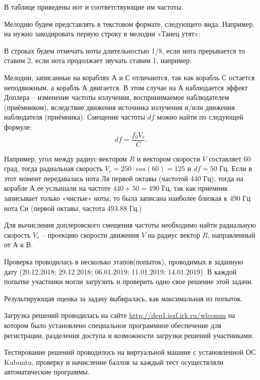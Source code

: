В таблице приведены нот и соответствующие им частоты.


\explaneSection

Мелодию будем представлять в текстовом формате, следующего вида. Например, на нужно закодировать первую строку в мелодии «Танец утят»:

В строках будем отмечать ноты длительностью 1/8, если нота прерывается то ставим 2, если нота продолжает звучать ставим 1, например:


Мелодии, записанные на кораблях А и С отличаются, так как корабль С остается неподвижным, а корабль А двигается. В этом случае на А наблюдается эффект Доплера – изменение частоты излучения, воспринимаемое наблюдателем (приёмником), вследствие движения источника излучения и/или движения наблюдателя (приёмника). Смещение частоты $df$ можно найти по следующей формуле:
$$df=\frac{f_0 V_r}{C}.$$

Например, угол между радиус-вектором $R$ и вектором скорости $V$ составляет 60 град, тогда радиальная скорость $V_r = 250 \cdot cos(60) = 125$ и $df = 50$ Гц. Если в этот момент передавалась нота Ля первой октавы (частотой 440 Гц), тогда на корабле А ее услышали на частоте $440+50=490$ Гц, так как приемник записывает только «чистые» ноты, то была записана наиболее близкая к 490 Гц нота Си (первой октавы, частота $493.88$ Гц.)


Для вычисления доплеровского смещения частоты необходимо найти радиальную скорость $V_r$ – проекцию скорости движения $V$ на радиус вектор $R$, направленный от А к В.

Проверка проводилась в несколько этапов(попыток), проводимых в заданную дату (20.12.2018; 29.12.2018; 06.01.2019; 11.01.2019; 14.01.2019). В каждой попытке участники могли загрузить и проверить одно свое решение этой задачи.

Результирующая оценка за задачу выбиралась, как максимальная из попыток.

Загрузка решений проводилась на сайте \url{http://dep1.iszf.irk.ru/wlcomm} на котором было установлено специальное программное обеспечение для регистрации, разделения доступа и возможности загрузки решений участниками.

Тестирование решений проводилось на виртуальной машине с установленной ОС Kubuntu, проверку и начисление баллов за каждый тест осуществляли автоматические программы.


